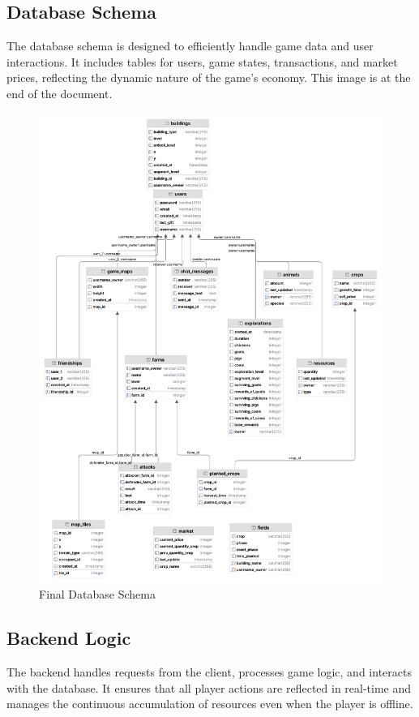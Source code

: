 \documentclass[12pt]{article}
\begin{document}
\subsection{Database Schema}
The database schema is designed to efficiently handle game data and user interactions. It includes tables for users, game states, transactions, and market prices, reflecting the dynamic nature of the game's economy. This image is at the end of the document.
\begin{figure}[h]
    \centering
    \includegraphics[width=\textwidth]{img/db-diagram.png}
    \caption{Final Database Schema}
    \label{fig:db_schema}
\end{figure}

\subsection{Backend Logic}
The backend handles requests from the client, processes game logic, and interacts with the database. It ensures that all player actions are reflected in real-time and manages the continuous accumulation of resources even when the player is offline.
\end{document}

